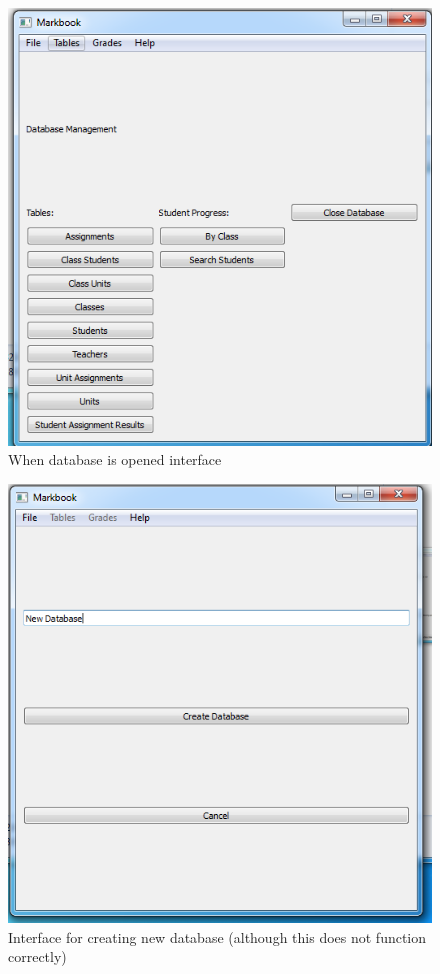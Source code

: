 \begin{figure}[H]   \includegraphics[width=\textwidth]{./Images/db_open.png}
    \caption{When database is opened interface} \label{}
\end{figure}

\begin{figure}[H]
    \includegraphics[width=\textwidth]{./Images/new_db.png}
    \caption{Interface for creating new database (although this does not function correctly)} \label{}
\end{figure}

